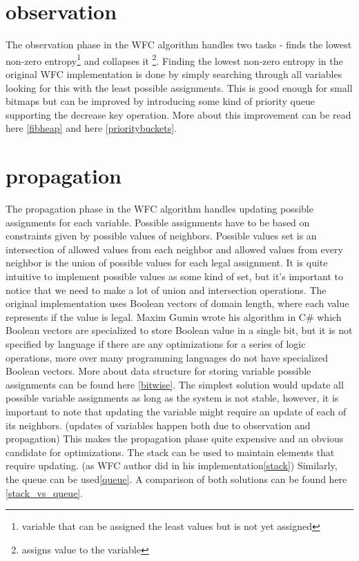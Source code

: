 \documentclass[shortabstract, english, inz]{iithesis}
\begin{document}
\section{observation}
The observation phase in the WFC algorithm handles two tasks - finds the lowest non-zero entropy\footnote{variable that can be assigned the least values but is not yet assigned} and collapses it \footnote{assigns value to the variable}.
Finding the lowest non-zero entropy in the original WFC implementation is done by simply searching through all variables looking for this with the least possible assignments. \cite{MaximGumin} This is good enough for small bitmaps but can be improved by introducing some kind of priority queue supporting the decrease key operation. More about this improvement can be read here \ref{fibheap} and here \ref{prioritybuckets}.
\section{propagation}
The propagation phase in the WFC algorithm handles updating possible assignments for each variable. Possible assignments have to be based on constraints given by possible values of neighbors. Possible values set is an intersection of allowed values from each neighbor and allowed values from every neighbor is the union of possible values for each legal assignment. It is quite intuitive to implement possible values as some kind of set, but it's important to notice that we need to make a lot of union and intersection operations.\break
The original implementation uses Boolean vectors of domain length, where each value represents if the value is legal. Maxim Gumin wrote his algorithm in C\# which Boolean vectors are specialized to store Boolean value in a single bit, but it is not specified by language if there are any optimizations for a series of logic operations, more over many programming languages do not have specialized Boolean vectors. More about data structure for storing variable possible assignments can be found here \ref{bitwise}.\break
The simplest solution would update all possible variable assignments as long as the system is not stable, however, it is important to note that updating the variable might require an update of each of its neighbors. (updates of variables happen both due to observation and propagation) This makes the propagation phase quite expensive and an obvious candidate for optimizations. The stack can be used to maintain elements that require updating. (as WFC author did in his implementation\ref{stack}) Similarly, the queue can be used\ref{queue}. A comparison of both solutions can be found here \ref{stack_vs_queue}.
\end{document}
